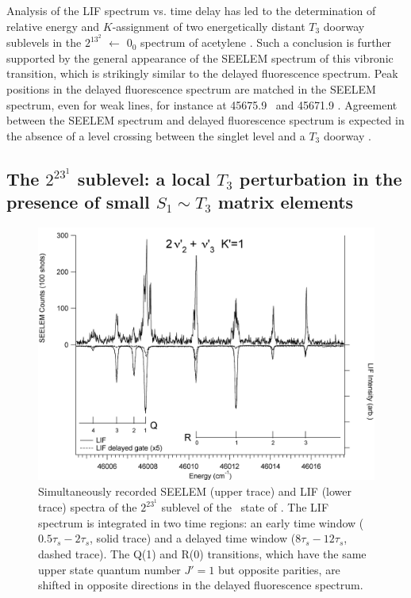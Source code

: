 \documentclass[12pt]{mitthesis}
\begin{document}
Analysis of the LIF spectrum vs. time delay has led to the
determination of relative energy and $K$-assignment of two
energetically distant $T_3$ doorway sublevels in the $2^13^2$ 
$\leftarrow$ $0_0$ spectrum of acetylene \astate.  Such a conclusion
is further supported by the general appearance of the SEELEM spectrum
of this vibronic transition, which is strikingly similar to the
delayed fluorescence spectrum.  Peak positions in the delayed
fluorescence spectrum are matched in the SEELEM spectrum, even for
weak lines, for instance at 45675.9 \rcm\ and 45671.9 \rcm.  Agreement
between the SEELEM spectrum and delayed fluorescence spectrum is
expected in the absence of a level crossing between the singlet level
and a $T_3$ doorway \cite{altunata01}.


\subsection{The $2^23^1$  sublevel: a local $T_3$
  perturbation in the presence of small $S_1 \sim T_3$ matrix
  elements}



\begin{figure}
  \caption{Simultaneously recorded SEELEM (upper trace) and LIF (lower
    trace) spectra of the $2^23^1$  sublevel of the \astate\
    state of .  The LIF spectrum is integrated in two time
    regions: an early time window ($0.5\tau_s-2\tau_s$, solid trace)
    and a delayed time window ($8\tau_s-12\tau_s$, dashed trace).  The
    Q(1) and R(0) transitions, which have the same upper state quantum
    number $J'=1$ but opposite parities, are shifted in opposite
    directions in the delayed fluorescence spectrum.}
  \label{fig:spectrum-2231}
  \centering
  \vspace{1cm}
  \includegraphics[width=7in,angle=90]{acetylene-2231-q4r3.png}
\end{figure}
\end{document}
